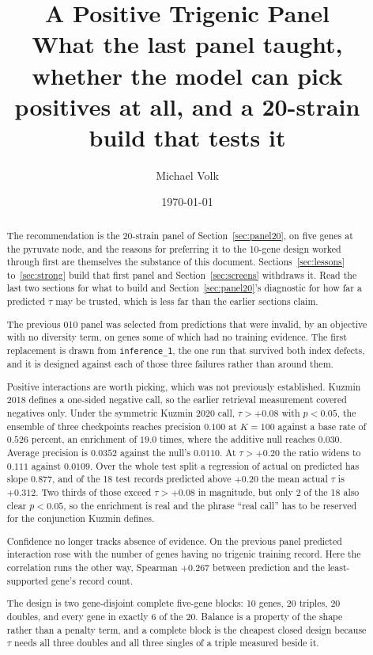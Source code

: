 \documentclass[10pt,a4paper]{article}
\title{\vspace{-1.5em}A Positive Trigenic Panel\\
  {\large What the last panel taught, whether the model can pick positives at
   all, and a 20-strain build that tests it}}
\author{Michael Volk}
\date{\today}
\theoremstyle{tcplain}
\begin{document}
\maketitle
\thispagestyle{empty}

\begin{abstract}
\noindent
The recommendation is the 20-strain panel of Section~\ref{sec:panel20}, on five
genes at the pyruvate node, and the reasons for preferring it to the 10-gene
design worked through first are themselves the substance of this document.
Sections~\ref{sec:lessons} to~\ref{sec:strong} build that first panel and
Section~\ref{sec:screens} withdraws it. Read the last two sections for what to
build and Section~\ref{sec:panel20}'s diagnostic for how far a predicted $\tau$
may be trusted, which is less far than the earlier sections claim.

The previous 010 panel was selected from predictions that were invalid, by an
objective with no diversity term, on genes some of which had no training
evidence. The first replacement is drawn from \texttt{inference\_1}, the one
run that survived both index defects, and it is designed against each of those
three failures rather than around them.

Positive interactions are worth picking, which was not previously established.
Kuzmin 2018 defines a one-sided negative call, so the earlier retrieval
measurement covered negatives only. Under the symmetric Kuzmin 2020 call,
$\tau > +0.08$ with $p < 0.05$, the ensemble of three checkpoints reaches
precision $0.100$ at $K = 100$ against a base rate of $0.526$ percent, an
enrichment of $19.0$ times, where the additive null reaches $0.030$. Average
precision is $0.0352$ against the null's $0.0110$. At $\tau > +0.20$ the ratio
widens to $0.111$ against $0.0109$. Over the whole test split a regression of
actual on predicted has slope $0.877$, and of the 18 test records predicted above
$+0.20$ the mean actual $\tau$ is $+0.312$. Two thirds of those exceed
$\tau > +0.08$ in magnitude, but only 2 of the 18 also clear $p < 0.05$, so the
enrichment is real and the phrase ``real call'' has to be reserved for the
conjunction Kuzmin defines.

Confidence no longer tracks absence of evidence. On the previous panel predicted
interaction rose with the number of genes having no trigenic training record.
Here the correlation runs the other way, Spearman $+0.267$ between prediction and
the least-supported gene's record count.

The design is two gene-disjoint complete five-gene blocks: 10 genes, 20 triples,
20 doubles, and every gene in exactly 6 of the 20. Balance is a property of the
shape rather than a penalty term, and a complete block is the cheapest closed
design because $\tau$ needs all three doubles and all three singles of a triple
measured beside it.


\end{abstract}
\end{document}

